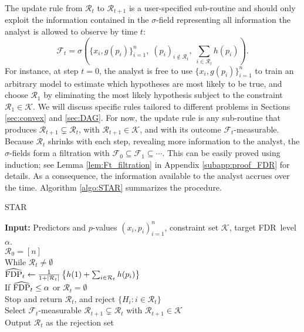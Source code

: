 \documentclass{biometrika}
\newcommand{\cF}{\mathcal{F}}
\newcommand{\cR}{\mathcal{R}}
\newcommand{\cK}{\mathcal{K}}
\newcommand{\textFDR}{FDR}
\newcommand{\Star}{STAR}
\newcommand{\hFDP}{\widehat{\textnormal{FDP}}}
\newcommand{\lb}{\left(}
\newcommand{\rb}{\right)}
\newcommand{\1}{\mathbf{1}}
\begin{document}
The update rule from $\cR_{t}$ to $\cR_{t+1}$ is a user-specified sub-routine and should only exploit the information contained in the $\sigma$-field representing all information the analyst is allowed to observe by time $t$:
\begin{equation}\label{eq:Ft}
\cF_{t} = \sigma\lb \{ x_{i}, g(p_{i})\}_{i=1}^{n},\;  (p_{i})_{i\notin \cR_{t}},\; \sum_{i\in \cR_{t}}h(p_{i})\rb.
\end{equation}
For instance, at step $t=0$, the analyst is free to use $\{x_{i}, g(p_{i})\}_{i=1}^{n}$ to train an arbitrary model to estimate which hypotheses are most likely to be true, and choose $\cR_1$ by eliminating the most likely hypothesis subject to the constraint $\cR_1 \in \cK$. We will discuss specific rules tailored to different problems in Sections \ref{sec:convex} and \ref{sec:DAG}. For now, the update rule is any sub-routine that produces $\cR_{t+1}\subsetneq \cR_{t}$, with $\cR_{t+1}\in \cK$, and with its outcome $\cF_{t}$-measurable. Because $\cR_t$ shrinks with each step, revealing more information to the analyst, the $\sigma$-fields form a filtration with $\cF_0 \subseteq \cF_1 \subseteq \cdots$. This can be easily proved using induction; see Lemma \ref{lem:Ft_filtration} in Appendix \ref{subapp:proof_FDR} for details. As a consequence, the information available to the analyst accrues over the time. Algorithm \ref{algo:STAR} summarizes the procedure. 

\begin{algo}\label{algo:STAR}
  \Star
  \begin{tabbing}
  \quad \textbf{Input: }Predictors and $p$-values $(x_{i}, p_{i})_{i=1}^{n}$, constraint set $\cK$, target \textFDR ~level $\alpha$.\\
  \quad $\cR_{0} = [n]$\\
  \quad While $\cR_{t}\not= \emptyset$\\
      \quad \qquad\enspace $\hFDP_{t}\gets \frac{1}{1 + |\cR_{t}|}\left\{ h(1) + \sum_{i\in \cR_{t}}h(p_{i})\right\}$\\
      \quad \qquad \enspace If $\hFDP_{t} \le \alpha$ or $\cR_t = \emptyset$\\
      \quad \qquad \qquad\enspace Stop and return $\cR_t$, and reject $\{H_{i}: i\in \cR_{t}\}$\\
      \quad \qquad\enspace Select $\cF_t$-measurable $\cR_{t+1}\subsetneq\cR_{t}$ with $\cR_{t+1}\in \cK$\\
  \quad Output $\cR_{t}$ as the rejection set
  \end{tabbing}
\end{algo}
\end{document}
